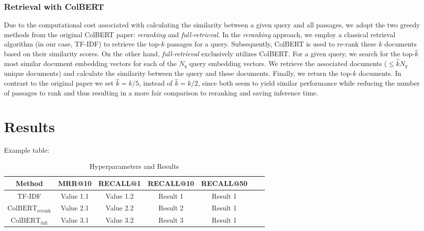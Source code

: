 \documentclass{article}
\begin{document}
\subsubsection{Retrieval with ColBERT}
Due to the computational cost associated with calculating the similarity between a given query and all passages, we adopt the two greedy methods from the original ColBERT paper: \textit{reranking} and \textit{full-retrieval}. In the \textit{reranking} approach, we employ a classical retrieval algorithm (in our case, TF-IDF) to retrieve the top-$k$ passages for a query. Subsequently, ColBERT is used to re-rank these $k$ documents based on their similarity scores. On the other hand, \textit{full-retrieval} exclusively utilizes ColBERT. For a given query, we search for the top-$\hat{k}$ most similar document embedding vectors for each of the $N_q$ query embedding vectors. We retrieve the associated documents ($\leq \hat{k}N_q$ unique documents) and calculate the similarity between the query and these documents. Finally, we return the top-$k$ documents. In contrast to the original paper we set $\hat{k} = k / 5$, instead of $\hat{k} = k / 2$, since both seem to yield similar performance while reducing the number of passages to rank and thus resulting in a more fair comparison to reranking and saving inference time.

\section{Results}


Example table:
\begin{table}[htbp]
    \centering
    \label{tab:hyperparameters}
    \begin{tabular}{ccccccc}
      \toprule
      \textbf{Method} & \textbf{MRR@10}  & \textbf{RECALL@1} & \textbf{RECALL@10} & \textbf{RECALL@50} \\
      \midrule
      TF-IDF & Value 1.1 & Value 1.2 & Result 1  & Result 1 \\
      $\text{ColBERT}_\text{rerank}$ & Value 2.1 & Value 2.2 & Result 2 & Result 1 \\
      $\text{ColBERT}_\text{full}$ & Value 3.1 & Value 3.2 & Result 3 & Result 1 \\
      \bottomrule
    \end{tabular}
    \caption{Hyperparameters and Results}
\end{table}
\end{document}
